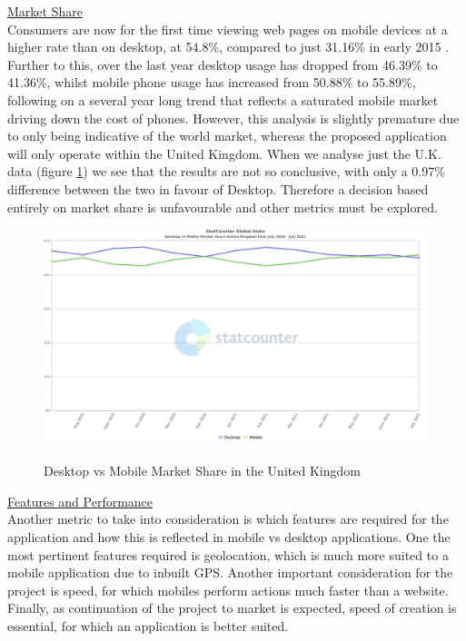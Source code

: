 \documentclass[12pt]{article}
\begin{document}
	\noindent
	\underline{Market Share}
	\\
	\noindent
	Consumers are now for the first time viewing web pages on mobile devices at a higher rate than on desktop, at 54.8\%, compared to just 31.16\% in early 2015 \cite{MobilePercentageWebsite2021}. Further to this, over the last year desktop usage has dropped from 46.39\% to 41.36\%, whilst mobile phone usage has increased from 50.88\% to 55.89\%, following on a several year long trend \cite{DesktopVsMobile2021} that reflects a saturated mobile market driving down the cost of phones. However, this analysis is slightly premature due to only being indicative of the world market, whereas the proposed application will only operate within the United Kingdom. When we analyse just the U.K. data (figure \ref{fig:uk-mobile-desktop}) we see that the results are not so conclusive, with only a 0.97\% difference between the two in favour of Desktop. Therefore a decision based entirely on market share is unfavourable and other metrics must be explored.
	
	\begin{figure}[H]
		\centering
		\includegraphics[scale=0.45]{images/GB-mobile-desktop.png}
		\caption{Desktop vs Mobile Market Share in the United Kingdom}
		\label{fig:uk-mobile-desktop}
		\cite{DesktopVsMobile2021a}
	\end{figure}

	\noindent
	\underline{Features and Performance}
	\\
	\noindent
	Another metric to take into consideration is which features are required for the application and how this is reflected in mobile vs desktop applications. One the most pertinent features required is geolocation, which is much more suited to a mobile application due to inbuilt GPS. Another important consideration for the project is speed, for which mobiles perform actions much faster than a website. Finally, as continuation of the project to market is expected, speed of creation is essential, for which an application is better suited.
\end{document}
